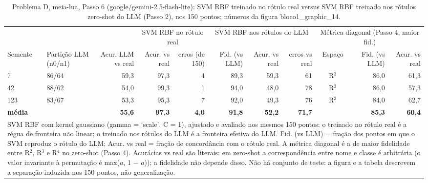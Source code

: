 \begin{table}[htbp]
\centering
\small
\caption{Problema D, meia-lua, Passo 6 (google/gemini-2.5-flash-lite): SVM RBF treinado no rótulo real versus SVM RBF treinado nos rótulos zero-shot do LLM (Passo 2), nos 150 pontos; números da figura bloco1\_graphic\_14.}
\label{tab:bloco1_D_passo6_svm_flashlite}
\begin{tabular}{llrrrrrrcrr}
\toprule
 &  &  & \multicolumn{2}{c}{SVM RBF no rótulo real} & \multicolumn{3}{c}{SVM RBF nos rótulos do LLM} & \multicolumn{3}{c}{Métrica diagonal (Passo 4, maior fid.)} \\ \cmidrule(lr){4-5} \cmidrule(lr){6-8} \cmidrule(lr){9-11}
Semente & Partição LLM (n0/n1) & Acur. LLM vs real & Acur. vs real & erros (de 150) & Fid. (vs LLM) & Acur. vs real & erros vs real & Espaço & Fid. (vs LLM) & Acur. vs real \\
\midrule
7 & 86/64 & 59,3 & 97,3 & 4 & 89,3 & 59,3 & 61 & R$^3$ & 86,0 & 61,3 \\
42 & 88/62 & 54,0 & 99,3 & 1 & 94,0 & 48,0 & 78 & R$^3$ & 86,0 & 57,3 \\
123 & 83/67 & 53,3 & 95,3 & 7 & 92,0 & 49,3 & 76 & R$^3$ & 84,0 & 62,7 \\
\textbf{média} &  & \textbf{55,6} & \textbf{97,3} & \textbf{4,0} & \textbf{91,8} & \textbf{52,2} & \textbf{71,7} &  & \textbf{85,3} & \textbf{60,4} \\
\bottomrule
\multicolumn{11}{p{0.95\linewidth}}{\footnotesize SVM RBF com kernel gaussiano (gamma = `scale', C = 1), ajustado e avaliado nos mesmos 150 pontos: o treinado no rótulo real é a régua de fronteira não linear; o treinado nos rótulos do LLM é a fronteira efetiva do LLM. Fid. (vs LLM) = fração dos pontos em que o SVM reproduz o rótulo do LLM; Acur. vs real = fração de concordância com o rótulo real. A métrica diagonal é a de maior fidelidade entre R$^2$, R$^3$ e R$^4$ no zero-shot (Passo 4). Acurácias vs real são literais: em zero-shot a correspondência entre nome e classe é arbitrária (o valor invariante à permutação é max($a$, 1 $-$ $a$)); a fidelidade não depende disso. Não há conjunto de teste: a figura e a tabela descrevem a separação induzida nos 150 pontos, não generalização.} \\
\end{tabular}
\end{table}
